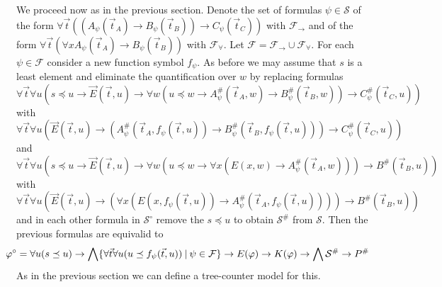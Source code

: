 \documentclass[a4paper,12pt]{report}
\theoremstyle{definition}
\theoremstyle{definition}
\theoremstyle{definition}
\theoremstyle{definition}
\theoremstyle{definition}
\theoremstyle{definition}
\theoremstyle{definition}
\begin{document}
	We proceed now as in the previous section. Denote the set of formulas $\psi\in\mathcal S$ of the form $\forall\vec t((A_\psi(\vec t_A)\to B_\psi(\vec t_B))\to C_\psi(\vec t_C))$ with $\mathcal F_\to$ and of the form $\forall \vec t(\forall xA_\psi(\vec t_A)\to B_\psi(\vec t_B))$ with $\mathcal F_\forall$. Let $\mathcal F = \mathcal F_\to\cup\mathcal F_\forall$. For each  $\psi\in\mathcal F$ consider a new function symbol $f_\psi$. As before we may assume that $s$ is a least element and eliminate the quantification over $w$ by replacing formulas
	$$\forall \vec t\forall u(s\preceq u\to\vec E(\vec t, u)\to \forall w(u\preceq w\to A_\psi^\#(\vec t_A, w)\to B_\psi^\#(\vec t_B, w))\to C_\psi^\#(\vec t_C, u))$$ with
		$$\forall \vec t\forall u(\vec E(\vec t, u)\to (A_\psi^\#(\vec t_A, f_\psi(\vec t, u))\to B_\psi^\#(\vec t_B, f_\psi(\vec t, u)))\to C_\psi^\#(\vec t_C, u))$$ and
		$$\forall \vec t\forall u(s\preceq u\to\vec E(\vec t, u)\to \forall w(u\preceq w\to \forall x(E(x, w)\to A_\psi^\#(\vec t_A, w)))\to B^\#(\vec t_B, u))$$ with $$\forall \vec t\forall u(\vec E(\vec t, u)\to (\forall x(E(x, f_\psi(\vec t, u))\to A_\psi^\#(\vec t_A, f_\psi(\vec t, u))))\to B^\#(\vec t_B, u))$$
	and in each other formula in $\mathcal S^\circ$ remove the $s\preceq u$ to obtain $\mathcal S^\#$ from $\mathcal S$. Then the previous formulas are equivalid to
	$$\hspace*{-.5cm}\varphi^\circ= \forall u(s\preceq u)\to \bigwedge\{\forall \vec t\forall u(u\preceq f_\psi(\vec t, u))\:|\:\psi\in\mathcal F\}\to E(\varphi)\to K(\varphi)\to\bigwedge\mathcal S^\#\to P^\#$$
	As in the previous section we can define a tree-counter model for this.
\end{document}
